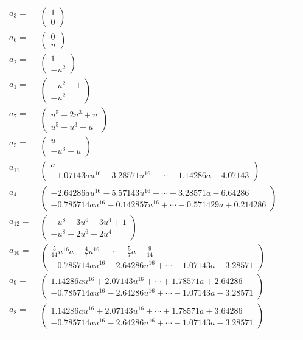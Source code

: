 \documentclass[1p]{elsarticle_modified}
\theoremstyle{definition}
\begin{document}
\begin{tabular}{m{7pt} m{180pt} m{7pt} m{180pt} }
\flushright $a_{3}=$&$\begin{pmatrix}1\\0\end{pmatrix}$ \\
\flushright $a_{6}=$&$\begin{pmatrix}0\\u\end{pmatrix}$ \\
\flushright $a_{2}=$&$\begin{pmatrix}1\\- u^2\end{pmatrix}$ \\
\flushright $a_{1}=$&$\begin{pmatrix}- u^2+1\\- u^2\end{pmatrix}$ \\
\flushright $a_{7}=$&$\begin{pmatrix}u^5-2 u^3+u\\u^5- u^3+u\end{pmatrix}$ \\
\flushright $a_{5}=$&$\begin{pmatrix}u\\- u^3+u\end{pmatrix}$ \\
\flushright $a_{11}=$&$\begin{pmatrix}a\\-1.07143 a u^{16}-3.28571 u^{16}+\cdots-1.14286 a-4.07143\end{pmatrix}$ \\
\flushright $a_{4}=$&$\begin{pmatrix}-2.64286 a u^{16}-5.57143 u^{16}+\cdots-3.28571 a-6.64286\\-0.785714 a u^{16}-0.142857 u^{16}+\cdots-0.571429 a+0.214286\end{pmatrix}$ \\
\flushright $a_{12}=$&$\begin{pmatrix}- u^8+3 u^6-3 u^4+1\\- u^8+2 u^6-2 u^4\end{pmatrix}$ \\
\flushright $a_{10}=$&$\begin{pmatrix}\frac{5}{14} u^{16} a-\frac{4}{7} u^{16}+\cdots+\frac{5}{7} a-\frac{9}{14}\\-0.785714 a u^{16}-2.64286 u^{16}+\cdots-1.07143 a-3.28571\end{pmatrix}$ \\
\flushright $a_{9}=$&$\begin{pmatrix}1.14286 a u^{16}+2.07143 u^{16}+\cdots+1.78571 a+2.64286\\-0.785714 a u^{16}-2.64286 u^{16}+\cdots-1.07143 a-3.28571\end{pmatrix}$ \\
\flushright $a_{8}=$&$\begin{pmatrix}1.14286 a u^{16}+2.07143 u^{16}+\cdots+1.78571 a+3.64286\\-0.785714 a u^{16}-2.64286 u^{16}+\cdots-1.07143 a-3.28571\end{pmatrix}$\\&\end{tabular}
\end{document}
